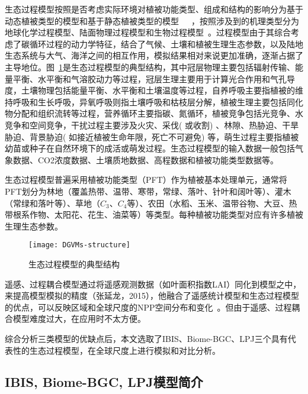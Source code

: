 生态过程模型按照是否考虑实际环境对植被功能类型、组成和结构的影响分为基于动态植被类型的模型和基于静态植被类型的模型~\cite{王绍刚2008森林碳循环模型方法研究进展}~\cite{王萍2009基于}~\cite{毛留喜2006陆地生态系统碳循环模型研究概述}，按照涉及到的机理类型分为地球化学过程模型、陆面物理过程模型和生物过程模型~\cite{谢馨瑶2018大尺度森林碳循环过程模拟模型综述}。过程模型由于其综合考虑了碳循环过程的动力学特征，结合了气候、土壤和植被生理生态参数，以及陆地生态系统与大气、海洋之间的相互作用，模拟结果相对来说更加准确，逐渐占据了主导地位。图~\ref{fig:DGVMs-structure}是生态过程模型的典型结构，其中冠层物理主要包括辐射传输、能量平衡、水平衡和气溶胶动力等过程，冠层生理主要用于计算光合作用和气孔导度，土壤物理包括能量平衡、水平衡和土壤温度等过程，自养呼吸主要指植被的维持呼吸和生长呼吸，异氧呼吸则指土壤呼吸和枯枝层分解，植被生理主要包括同化物分配和组织流转等过程，营养循环主要指碳、氮循环，植被竞争包括光竞争、水竞争和空间竞争，干扰过程主要涉及火灾、采伐( 或收割) 、林隙、热胁迫、干旱胁迫、背景胁迫( 如接近植被生命年限，死亡不可避免) 等，萌生过程主要指植被幼苗或种子在自然环境下的成活或萌发过程。生态过程模型的输入数据一般包括气象数据、CO2浓度数据、土壤质地数据、高程数据和植被功能类型数据等。

生态过程模型普遍采用植被功能类型（PFT）作为植被基本处理单元，通常将PFT划分为林地（覆盖热带、温带、寒带，常绿、落叶、针叶和阔叶等）、灌木（常绿和落叶等）、草地（$C_3$、$C_4$等）、农田（水稻、玉米、温带谷物、大豆、热带根系作物、太阳花、花生、油菜等）等类型。每种植被功能类型对应有许多植被生理生态参数。

\begin{figure}
    \centering
    \texttt{[image: DGVMs-structure]}
    \caption{生态过程模型的典型结构}
    \label{fig:DGVMs-structure}
\end{figure}

遥感、过程耦合模型通过将遥感观测数据（如叶面积指数LAI）同化到模型之中，来提高模型模拟的精度（张延龙，2015），他融合了遥感统计模型和生态过程模型的优点，可以反映区域和全球尺度的NPP空间分布和变化~\cite{朱文泉2005陆地植被净初级生产力计算模型研究进展}。但由于遥感、过程耦合模型难度过大，在应用时不太方便。

综合分析三类模型的优缺点后，本文选取了IBIS、Biome-BGC、LPJ三个具有代表性的生态过程模型，在全球尺度上进行模拟和对比分析。

\subsection{IBIS, Biome-BGC, LPJ模型简介}
